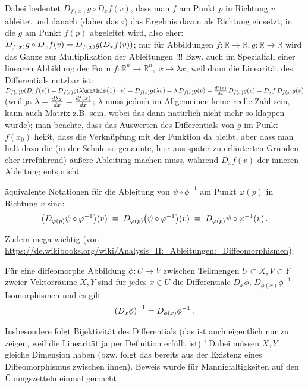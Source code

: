 \documentclass[../H_Analysis_main.tex]{subfiles}
\begin{document}
Dabei bedeutet $D_{f(x)} g \circ D_x f (v)$, dass man $f$ am Punkt $p$ in Richtung $v$ ableitet und danach (daher das $\circ$) das Ergebnis davon als Richtung einsetzt, in die $g$ am Punkt $f(p)$ abgeleitet wird, also eher: $D_{f(x)} g \circ D_x f (v) = D_{f(x)} g \qty(D_x f (v))$; nur für Abbildungen $f: \mathbb{R} \rightarrow \mathbb{R}, g: \mathbb{R} \rightarrow \mathbb{R}$ wird das Ganze zur Multiplikation der Ableitungen !!! Bzw. auch im Spezialfall einer linearen Abbildung der Form $f: \mathbb{R}^n \rightarrow \mathbb{R}^n, \; x \mapsto \lambda x$, weil dann die Linearität des Differentials nutzbar ist: $D_{f(x)} g \qty(D_x f (v)) = D_{f(x)} g \qty(\lambda \mathds{1} \cdot v) = D_{f(x)} g \qty(\lambda v) = \lambda \, D_{f(x)} g \qty(v) = \dv{f(x)}{x} \, D_{f(x)} g \qty(v) = D_x f \, D_{f(x)} g \qty(v)$ (weil ja $\lambda = \dv{\lambda x}{x} = \dv{f(x)}{x}$; $\lambda$ muss jedoch im Allgemeinen keine reelle Zahl sein, kann auch Matrix z.B. sein, wobei das dann natürlich nicht mehr so klappen würde); man beachte, dass das Auswerten des Differentials von $g$ im Punkt $f(x_0)$ heißt, dass die Verknüpfung mit der Funktion da bleibt, aber dass man halt dazu die (in der Schule so genannte, hier aus später zu erläuterten Gründen eher irreführend) äußere Ableitung machen muss, während $D_x f(v)$ der inneren Ableitung entspricht

äquivalente Notationen für die Ableitung von $\psi \circ \phi^{-1}$ am Punkt $\varphi(p)$ in Richtung $v$ sind:
\begin{equation}
\qty(D_{\varphi(p)} \psi \circ \varphi^{-1})(v) \; \equiv \; D_{\varphi(p)} \qty(\psi \circ \varphi^{-1})(v) \; \equiv \; D_{\varphi(p)} \psi \circ \varphi^{-1}(v) \, .
\end{equation}



Zudem mega wichtig (von \url{https://de.wikibooks.org/wiki/Analysis_II:_Ableitungen:_Diffeomorphismen}):
\begin{satz}
Für eine diffeomorphe Abbildung $\phi: U \rightarrow V$ zwischen Teilmengen $U \subset X, V \subset Y$ zweier Vektorräume $X, Y$ sind für jedes $x \in U$ die Differentiale $D_x \phi, \, D_{\phi(x)} \phi^{-1}$ Isomorphismen und es gilt
\begin{equation}
\qty(D_x \phi)^{-1} = D_{\phi(x)} \phi^{-1} \, .
\end{equation}
\end{satz}
Insbesondere folgt Bijektivität des Differentials (das ist auch eigentlich nur zu zeigen, weil die Linearität ja per Definition erfüllt ist) ! Dabei müssen $X, Y$ gleiche Dimension haben (bzw. folgt das bereits aus der Existenz eines Diffeomorphismus zwischen ihnen). Beweis wurde für Mannigfaltigkeiten auf den Übungszetteln einmal gemacht
\end{document}
